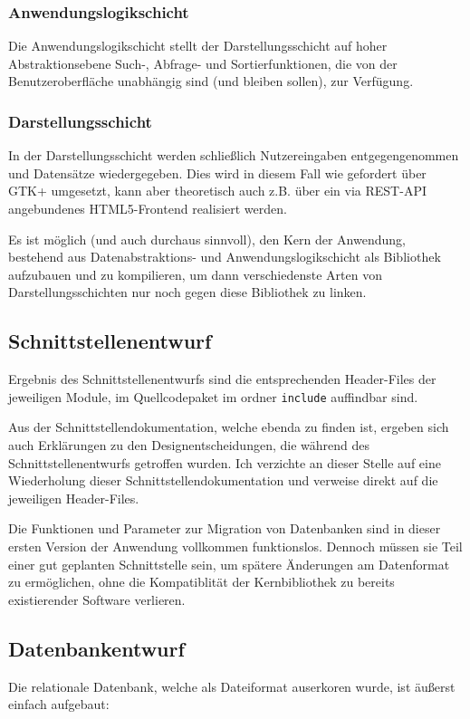 \subsubsection{Anwendungslogikschicht}
Die Anwendungslogikschicht stellt der Darstellungsschicht auf hoher Abstraktionsebene Such-, Abfrage-
und Sortierfunktionen, die von der Benutzeroberfläche unabhängig sind (und bleiben sollen), zur Verfügung.

\subsubsection{Darstellungsschicht}
In der Darstellungsschicht werden schließlich Nutzereingaben entgegengenommen und
Datensätze wiedergegeben. Dies wird in diesem Fall wie gefordert über GTK+ umgesetzt,
kann aber theoretisch auch z.B. über ein via REST-API angebundenes HTML5-Frontend
realisiert werden.

Es ist möglich (und auch durchaus sinnvoll), den Kern der Anwendung, bestehend aus Datenabstraktions- und
Anwendungslogikschicht als Bibliothek aufzubauen und zu kompilieren, um dann verschiedenste Arten von
Darstellungsschichten nur noch gegen diese Bibliothek zu linken.

\subsection{Schnittstellenentwurf}
Ergebnis des Schnittstellenentwurfs sind die entsprechenden Header-Files der jeweiligen Module,
im Quellcodepaket im ordner \lstinline{include} auffindbar sind.

Aus der Schnittstellendokumentation, welche ebenda zu finden ist, ergeben sich auch Erklärungen zu
den Designentscheidungen, die während des Schnittstellenentwurfs getroffen wurden.
Ich verzichte an dieser Stelle auf eine Wiederholung dieser Schnittstellendokumentation und verweise
direkt auf die jeweiligen Header-Files.

Die Funktionen und Parameter zur Migration von Datenbanken sind in dieser ersten Version der Anwendung
vollkommen funktionslos. Dennoch müssen sie Teil einer gut geplanten Schnittstelle sein, um spätere
Änderungen am Datenformat zu ermöglichen, ohne die Kompatiblität der Kernbibliothek zu bereits existierender
Software verlieren.

\subsection{Datenbankentwurf}
Die relationale Datenbank, welche als Dateiformat auserkoren wurde, ist äußerst
einfach aufgebaut:

